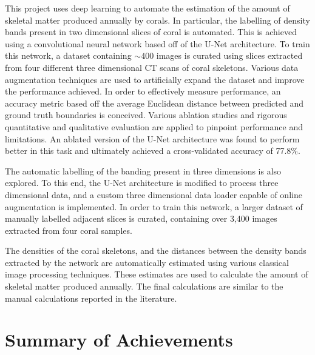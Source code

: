 This project uses deep learning to automate the estimation of the amount of skeletal matter produced annually by corals. In particular, the labelling of density bands present in two dimensional slices of coral is automated. This is achieved using a convolutional neural network based off of the U-Net architecture. To train this network, a dataset containing ${\sim}400$ images is curated using slices extracted from four different three dimensional CT scans of coral skeletons. Various data augmentation techniques are used to artificially expand the dataset and improve the performance achieved. In order to effectively measure performance, an accuracy metric based off the average Euclidean distance between predicted and ground truth boundaries is conceived. Various ablation studies and rigorous quantitative and qualitative evaluation are applied to pinpoint performance and limitations. An ablated version of the U-Net architecture was found to perform better in this task and ultimately achieved a cross-validated accuracy of 77.8\%.

The automatic labelling of the banding present in three dimensions is also explored. To this end, the U-Net architecture is modified to process three dimensional data, and a custom three dimensional data loader capable of online augmentation is implemented. In order to train this network, a larger dataset of manually labelled adjacent slices is curated, containing over 3,400 images extracted from four coral samples.

The densities of the coral skeletons, and the distances between the density bands extracted by the network are automatically estimated using various classical image processing techniques. These estimates are used to calculate the amount of skeletal matter produced annually. The final calculations are similar to the manual calculations reported in the literature.

\section*{Summary of Achievements}

